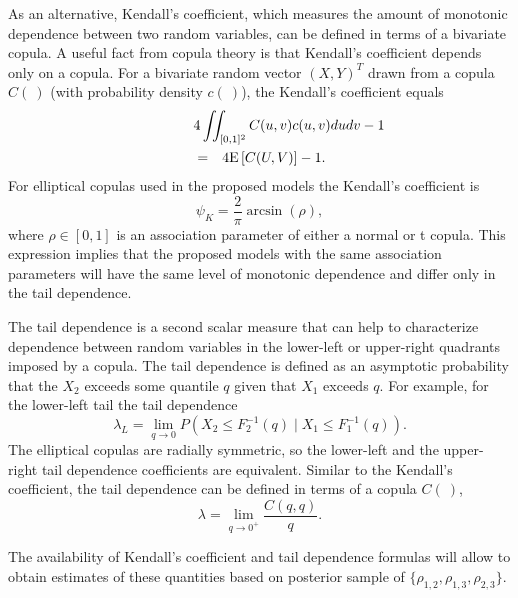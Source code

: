 \documentclass[12pt]{article}
\begin{document}
As an alternative, Kendall's  coefficient, which
measures the amount of monotonic dependence between two random variables,
can be defined in terms of a bivariate copula\citep{Joe1997,Nel2007}. A useful fact from copula
theory is that Kendall's coefficient depends only on a copula. For a bivariate random vector $(X, Y)^T$ drawn from a copula $C(\:)$ (with probability density $c(\:)$), the Kendall's coefficient equals
\begin{eqnarray}
\lefteqn{4 \iint_{[0,1]^2}C(u,v)c(u,v)dudv - 1} \nonumber \\ 
& = & 4 \mathrm{E}\left[C(U,V)\right] - 1.
\end{eqnarray}
For elliptical copulas used in the proposed
models the Kendall's coefficient is
%
\begin{equation}
\psi_K = \frac{2}{\pi} \arcsin(\rho),
\end{equation} 
%
where $\rho \in [0, 1]$ is an association parameter of either a normal or t
copula. This expression implies that the proposed models with the same
association parameters will have the same level of monotonic dependence and
differ only in the tail dependence.

The tail dependence is a second scalar measure that can help to characterize dependence between random variables in the lower-left or upper-right quadrants imposed by a copula. The tail dependence is defined as an asymptotic probability that the $X_2$ exceeds some quantile $q$ given that $X_1$ exceeds $q$. For example, for the lower-left tail the tail dependence
\begin{equation}
\lambda_L = \lim_{q \to 0}P\left(X_2 \leq F_2^{-1}(q) \mid X_1 \leq F_1^{-1}(q)\right).
\end{equation}
The elliptical copulas are radially symmetric, so the lower-left and the upper-right tail dependence coefficients are equivalent. Similar to the Kendall's coefficient, the tail dependence can be defined in terms of a copula $C(\:)$,
\begin{equation}
\lambda = \lim_{q \to 0^+}\frac{C(q, q)}{q}.
\end{equation}

The availability of Kendall's coefficient and tail dependence formulas will allow to obtain estimates of these quantities based on posterior sample of $\{\rho_{1,2},\rho_{1,3},\rho_{2,3}\}$.
\end{document}
